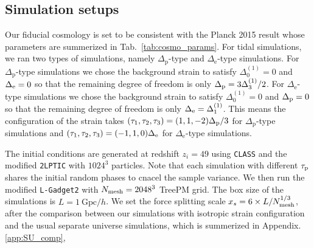 \documentclass[a4paper,11pt]{article}
\begin{document}



\subsection{Simulation setups}
Our fiducial cosmology is set to be consistent with the Planck 2015 result\cite{Planck2015} whose parameters are summerized in Tab.~\ref{tab:cosmo_params}.
For tidal simulations, we ran two types of simulations, namely $\Delta_\mathrm{p}$-type and $\Delta_\mathrm{e}$-type simulations.
For $\Delta_\mathrm{p}$-type simulations
we chose the background strain to satisfy
$\Delta^{(1)}_0=0$ and $\Delta_{\rm e}=0$ so that the remaining degree of freedom is only $\Delta_{\rm p} = 3\Delta^{(1)}_3/2$.
For $\Delta_\mathrm{e}$-type simulations
we chose the background strain to satisfy
$\Delta^{(1)}_0=0$ and $\Delta_{\rm p}=0$ so that the remaining degree of freedom is only $\Delta_{\rm e} = \Delta^{(1)}_1$.
This means the configuration of the strain takes $(\tau_1, \tau_2, \tau_3) = ( 1, 1, -2 )\Delta_{\rm p}/3$ for $\Delta_\mathrm{p}$-type simulations
and $(\tau_1, \tau_2, \tau_3) = ( -1, 1, 0)\Delta_{\rm e}$ for $\Delta_\mathrm{e}$-type simulations.

The initial conditions are generated at redshift $z_i=49$ using \texttt{CLASS} and the modified \texttt{2LPTIC} with $1024^3$ particles.
Note that each simulation with different $\tau_{\rm p}$ shares the initial random phases to cnacel the sample variance.
We then run the modified \texttt{L-Gadget2} with $N_{\rm mesh}=2048^3$ TreePM grid.
The box size of the simulations is $L = 1~ \mathrm{Gpc}/h$.
We set the force splitting scale $x_s=6 \times L/N^{1/3}_{\rm mesh}$,
after the comparison between our simulations with isotropic strain configuration and the usual separate universe simulations,
which is summerized in Appendix.\ref{app:SU_comp},
\end{document}
